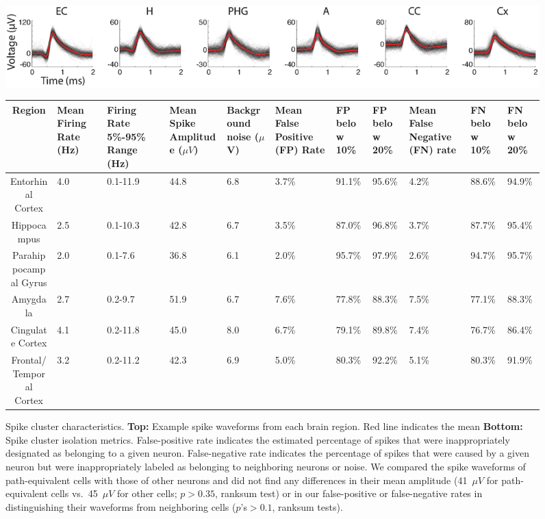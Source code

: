 	
\clearpage
\begin{figure}
\begin{center}
\includegraphics[width=.99\textwidth]{./tex/linearGrids/figs/waveforms}
\scriptsize	
 \begin{tabular}{|c|C{.8cm}|C{1.3cm}|C{1cm}|C{1cm}|C{1cm}|C{.8cm}|C{.8cm}|C{1cm}|C{.8cm}|C{.8cm}|}
\hline
Region &Mean Firing Rate (Hz) &Firing Rate 5\%-95\% Range (Hz) &Mean Spike Amplitude ($\mu{}V$) &Background noise  ($\mu{}$V) &Mean False Positive (FP) Rate &FP below 10\% &FP below 20\% &Mean False Negative (FN) rate &FN below 10\% &FN below 20\%\\\hline
Entorhinal Cortex &4.0 &0.1-11.9 &44.8 &6.8 &3.7\% &91.1\% &95.6\% &4.2\% &88.6\% &94.9\%\\
Hippocampus &2.5 &0.1-10.3 &42.8 &6.7 &3.5\% &87.0\% &96.8\% &3.7\% &87.7\% &95.4\%\\
Parahippocampal Gyrus &2.0 &0.1-7.6 &36.8 &6.1 &2.0\% &95.7\% &97.9\% &2.6\% &94.7\% &95.7\%\\
Amygdala &2.7 &0.2-9.7 &51.9 &6.7 &7.6\% &77.8\% &88.3\% &7.5\% &77.1\% &88.3\%\\
Cingulate Cortex &4.1 &0.2-11.8 &45.0 &8.0 &6.7\% &79.1\% &89.8\% &7.4\% &76.7\% &86.4\%\\
Frontal/Temporal Cortex &3.2 &0.2-11.2 &42.3 &6.9 &5.0\% &80.3\% &92.2\% &5.1\% &80.3\% &91.9\%\\
\hline
\end{tabular}
\caption[Spike cluster characteristics]{Spike cluster characteristics. \textbf{Top:} Example spike waveforms from each brain region. Red line indicates the mean \textbf{Bottom:} Spike cluster isolation metrics. False-positive rate indicates the estimated percentage of spikes that were inappropriately designated as belonging to a given neuron.  False-negative rate indicates the percentage of spikes that were caused by a given neuron but were inappropriately labeled as belonging to neighboring neurons or noise. We compared the spike waveforms of path-equivalent cells with those of other neurons and did not find any differences in their mean amplitude (41~$\mu V$ for path-equivalent cells vs.\ 45~$\mu V$ for other cells; $p>0.35$, ranksum test) or in our false-positive or false-negative rates in  distinguishing their waveforms from neighboring cells ($p$'s$>0.1$, ranksum tests).}
\end{center}
\end{figure}	
	
